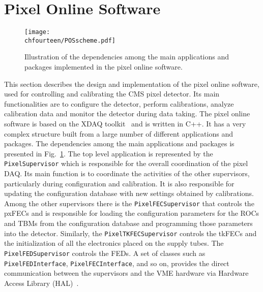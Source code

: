 \section{Pixel Online Software}\label{sec:BPix_POS}

\begin{figure}[!htb]
 \begin{center}
 \texttt{[image: \\chfourteen/POSscheme.pdf]}
 \end{center}
 \caption{Illustration of the dependencies among the main applications and packages implemented in the pixel online software.}
 \label{fig:POS}
\end{figure}

This section describes the design and implementation of the pixel online software, used for controlling and calibrating the CMS pixel detector.
Its main functionalities are to configure the detector, perform calibrations, analyze calibration data and monitor the detector during data taking.
The pixel online software is based on the XDAQ toolkit~\cite{Brigljevic:2003kg} and is written in C++. It has a very complex structure built from a large number of different applications and packages.
The dependencies among the main applications and packages is presented in Fig.~\ref{fig:POS}.
The top level application is represented by the \texttt{PixelSupervisor} which is responsible for the overall coordination of the pixel DAQ.
Its main function is to coordinate the activities of the other supervisors, particularly during configuration and calibration.
It is also responsible for updating the configuration database with new settings obtained by calibrations.
Among the other supervisors there is the \texttt{PixelFECSupervisor} that controls the pxFECs and is responsible for loading the configuration parameters for the ROCs and TBMs from the configuration database and programming those parameters into the detector.
Similarly, the \texttt{PixelTKFECSupervisor} controls the tkFECs and the initialization of all the electronics placed on the supply tubes. The \texttt{PixelFEDSupervisor} controls the FEDs.
A set of classes such as \texttt{PixelFEDInterface}, \texttt{PixelFECInterface}, and so on, provides the direct communication between the supervisors and the VME hardware via Hardware Access Library (HAL)~\cite{HAL}.
